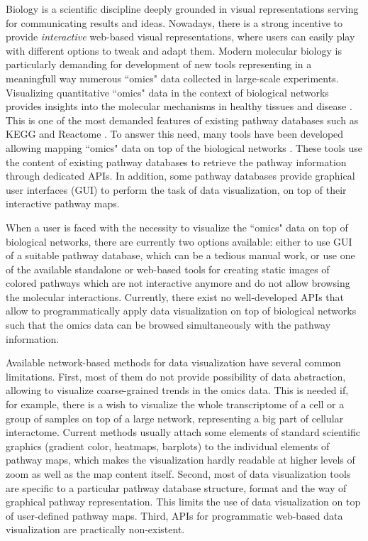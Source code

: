 \documentclass[a4,center,fleqn]{NAR}
\begin{document}
Biology is a scientific discipline deeply grounded in visual representations
serving for communicating results and ideas. Nowadays, there is a strong
incentive to provide \emph{interactive} web-based visual representations, where
users can easily play with different options to tweak and adapt them. Modern
molecular biology is particularly demanding for development of new tools
representing in a meaningfull way numerous ``omics" data collected in
large-scale experiments. Visualizing quantitative ``omics" data in the context
of biological networks provides insights into the molecular mechanisms in
healthy tissues and disease \cite{Gehlenborg2010,Barillot2012}. This is one of
the most demanded features of existing pathway databases such as KEGG 
and Reactome \cite{Kanehisa2012, Croft2014}. To answer this need, many tools
have been developed allowing mapping ``omics" data on top of the biological
networks \cite{Arakawa2005,vanIersel2008,Luo2013, Nishida2014}. These tools use
the content of existing pathway databases to retrieve the pathway information
through dedicated APIs. In addition, some pathway databases provide graphical
user interfaces (GUI) to perform the task of data visualization, on top of
their interactive pathway maps.

When a user is faced with the necessity to visualize the ``omics" data on top of
biological networks, there are currently two options available: either to use
GUI of a suitable pathway database, which can be a tedious manual work, or use
one of the available standalone or web-based tools for creating static images
of colored pathways which are not interactive anymore and do not allow browsing
the molecular interactions. Currently, there exist no well-developed APIs
that allow to programmatically apply data visualization on top of biological
networks such that the omics data can be browsed simultaneously with the
pathway information.

Available network-based methods for data visualization have several common
limitations. First, most of them do not provide possibility of data
abstraction, allowing to visualize coarse-grained trends in the omics data.
This is needed if, for example, there is a wish to visualize the whole
transcriptome of a cell or a group of samples on top of a large network,
representing a big part of cellular interactome. Current methods usually attach
some elements of standard scientific graphics (gradient color, heatmaps,
barplots) to the individual elements of pathway maps, which makes the
visualization hardly readable at higher levels of zoom as well as the map
content itself. Second, most of data visualization tools are specific to a
particular pathway database structure, format and the way of graphical pathway
representation. This limits the use of data visualization on top of
user-defined pathway maps. Third, APIs for programmatic web-based data
visualization are practically non-existent.
\end{document}
